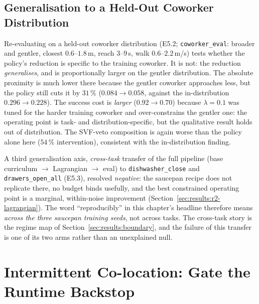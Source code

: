 \documentclass[11pt,a4paper]{report}
\begin{document}
\subsection{Generalisation to a Held-Out Coworker Distribution}
\label{sec:results:ood}

Re-evaluating on a held-out coworker distribution (E5.2;
\texttt{coworker\_eval}: broader and gentler, closest
$0.6$--$1.8$\,m, reach $3$--$9$\,s, walk $0.6$--$2.2$\,m/s) tests
whether the policy's reduction is specific to the training coworker.
It is not: the reduction \emph{generalises}, and is proportionally
larger on the gentler distribution. The absolute proximity is much
lower there because the gentler coworker approaches less, but the
policy still cuts it by $31\,\%$ ($0.084 \rightarrow 0.058$, against
the in-distribution $0.296 \rightarrow 0.228$). The success cost is
\emph{larger} ($0.92 \rightarrow 0.70$) because $\lambda = 0.1$ was
tuned for the harder training coworker and over-constrains the
gentler one: the operating point is task- and distribution-specific,
but the qualitative result holds out of distribution. The SVF-veto
composition is again worse than the policy alone here ($54\,\%$
intervention), consistent with the in-distribution finding.

A third generalisation axis, \emph{cross-task} transfer of the full
pipeline (base curriculum $\rightarrow$ Lagrangian $\rightarrow$
eval) to \texttt{dishwasher\_close} and \texttt{drawers\_open\_all}
(E5.3), resolved \emph{negative}: the saucepan recipe does not
replicate there, no budget binds usefully, and the best constrained
operating point is a marginal, within-noise improvement
(Section~\ref{sec:results:r2-lagrangian}). The word
``reproducibly'' in this chapter's headline therefore means
\emph{across the three saucepan training seeds}, not across tasks.
The cross-task story is the regime map of
Section~\ref{sec:results:boundary}, and the failure of this transfer
is one of its two arms rather than an unexplained null.

\section{Intermittent Co-location: Gate the Runtime Backstop}
\label{sec:results:r2}
\end{document}
